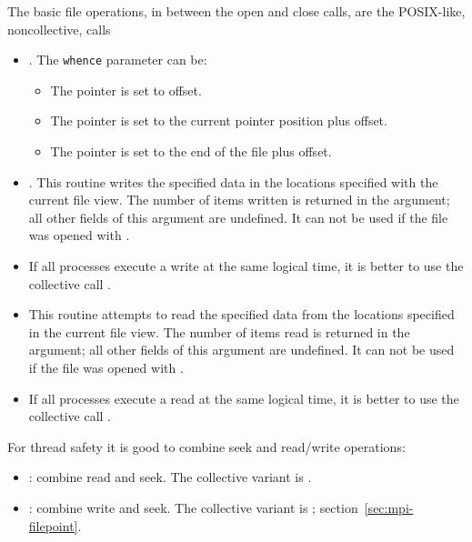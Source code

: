 The basic file operations, in between the open and close calls, are
the POSIX-like, noncollective, calls
\begin{itemize}
\item {}. The \lstinline{whence} parameter can be:
  \begin{itemize}
  \item {} The pointer is set to offset.
  \item {} The pointer is set to the current
    pointer position plus offset.
  \item {} The pointer is set to the end of
    the file plus offset.
  \end{itemize}
\item {}. This routine writes the specified data
  in the locations specified with the current file view. 
  The number of items written is returned in the  argument;
  all other fields of this argument are undefined.
  It can not be used if the file
  was opened with .
\item If all processes execute a write at the same logical time, it is
  better to use the collective call
  .
\item {} This routine attempts to read the specified data
  from the locations specified in the current file view. 
  The number of items read is returned in the  argument;
  all other fields of this argument are undefined.
  It can not be used if the file
  was opened with .
\item If all processes execute a read at the same logical time, it is
  better to use the collective call
  .
\end{itemize}

For thread safety it is good to combine seek and read/write operations:
\begin{itemize}
\item {}: combine read and seek.
  The collective variant is .
\item {}: combine write and seek.
  The collective variant is ;
  section~\ref{sec:mpi-filepoint}.
\end{itemize}


